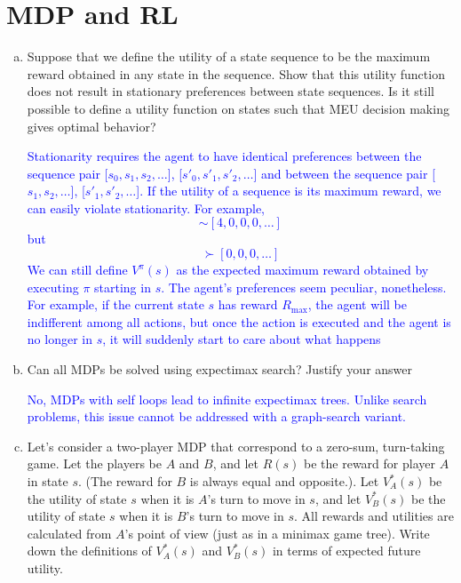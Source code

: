 \documentclass[a4paper]{article}
\begin{document}
\section{MDP and RL}

\begin{enumerate}[(a)]
\item Suppose that we define the utility of a state sequence to be the maximum reward obtained in any state in the sequence. Show that this utility function does not result in stationary preferences between state sequences. Is it still possible to define a utility function on states such that MEU decision making gives optimal behavior?

\textcolor{blue}{Stationarity requires the agent to have identical preferences between the sequence pair [$s_0, s_1, s_2, \ldots$], [$s'_0, s'_1, s'_2, \ldots$] and between the sequence pair [$s_1, s_2, \ldots$], [$s'_1, s'_2, \ldots$]. If the utility of a sequence is its maximum reward, we can easily violate stationarity. For example,
\begin{equation*}
[4, 3, 0, 0, 0, \ldots] \sim [4, 0, 0, 0, \ldots]
\end{equation*}
but 
\begin{equation*}
[3, 0, 0, 0, \ldots] \succ [0, 0, 0, \ldots]
\end{equation*}
We can still define $V^\pi(s)$ as the expected maximum reward obtained by executing $\pi$ starting in $s$. The agent’s preferences seem peculiar, nonetheless. For example, if the current state $s$ has reward $R_{\max}$, the agent will be indifferent among all actions, but once the action is executed and the agent is no longer in $s$, it will suddenly start to care about what happens
}

\item Can all MDPs be solved using expectimax search? Justify your answer

\textcolor{blue}{No, MDPs with self loops lead to infinite expectimax trees. Unlike search problems, this issue cannot be addressed with a graph-search variant.}

\item Let's consider a two-player MDP that correspond to a zero-sum, turn-taking game. Let the players be $A$ and $B$, and let $R(s)$ be the reward for player $A$ in state $s$. (The reward for $B$ is always equal and opposite.). Let $V^*_A(s)$ be the utility of state $s$ when it is $A$’s turn to move in $s$, and let $V^*_B(s)$ be the utility of state $s$ when it is $B$’s turn to move in $s$. All rewards and utilities are calculated from $A$’s point of view (just as in a minimax game tree). Write down the definitions of $V^*_A(s)$ and $V^*_B(s)$ in terms of expected future utility. 


\end{enumerate}
\end{document}
